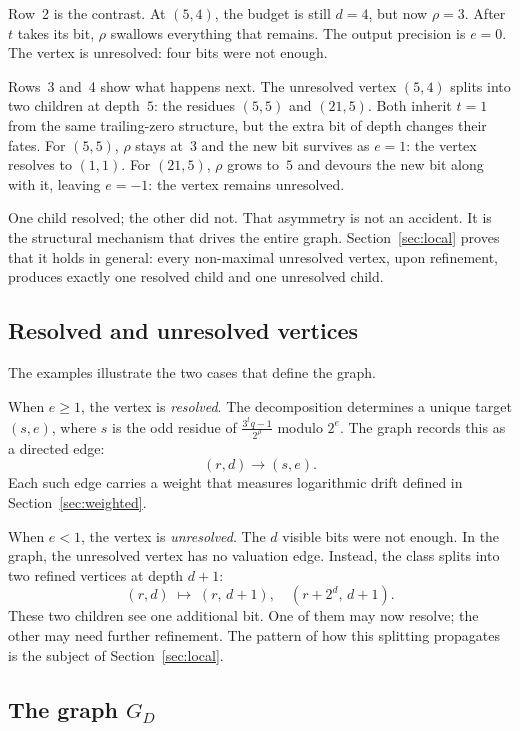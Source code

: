 \documentclass[11pt]{amsart}
\theoremstyle{definition}
\theoremstyle{remark}
\begin{document}
Row~2 is the contrast.  At $(5,4)$, the budget is still $d=4$, but now $\rho=3$.  After $t$ takes its bit, $\rho$ swallows everything that remains.  The output precision is $e=0$.  The vertex is unresolved: four bits were not enough.

Rows~3 and~4 show what happens next.  The unresolved vertex $(5,4)$ splits into two children at depth~$5$: the residues $(5,5)$ and $(21,5)$.  Both inherit $t=1$ from the same trailing-zero structure, but the extra bit of depth changes their fates.  For $(5,5)$, $\rho$ stays at~$3$ and the new bit survives as $e=1$: the vertex resolves to $(1,1)$.  For $(21,5)$, $\rho$ grows to~$5$ and devours the new bit along with it, leaving $e=-1$: the vertex remains unresolved.

One child resolved; the other did not.  That asymmetry is not an accident. It is the structural mechanism that drives the entire graph.  Section~\ref{sec:local} proves that it holds in general: every non-maximal unresolved vertex, upon refinement, produces exactly one resolved child and one unresolved child.

\subsection{Resolved and unresolved vertices}

The examples illustrate the two cases that define the graph.

When $e\ge1$, the vertex is \emph{resolved}.  The decomposition determines a unique target $(s,e)$, where $s$ is the odd residue of $\frac{3^tq-1}{2^\rho}$ modulo $2^e$.  The graph records this as a directed edge:
\[
(r,d)\to(s,e).
\]
Each such edge carries a weight that measures logarithmic drift defined in Section~\ref{sec:weighted}.

When $e<1$, the vertex is \emph{unresolved}.  The $d$ visible bits were not enough.  In the graph, the unresolved vertex has no valuation edge.  Instead, the class splits into two refined vertices at depth $d+1$:
\[
(r,d)\;\longmapsto\;(r,\,d+1),\quad (r+2^d,\,d+1).
\]
These two children see one additional bit.  One of them may now resolve; the other may need further refinement.  The pattern of how this splitting propagates is the subject of Section~\ref{sec:local}.

\subsection{The graph $G_D$}
\end{document}
